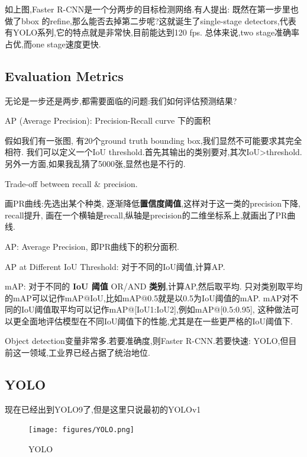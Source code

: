 如上图,Faster R-CNN是一个分两步的目标检测网络.有人提出:
既然在第一步里也做了bbox 的refine,那么能否去掉第二步呢?这就诞生了single-stage 
detectors,代表有YOLO系列,它的特点就是非常快,目前能达到120 fps.
总体来说,two stage准确率占优,而one stage速度更快.

\subsection{Evaluation Metrics}

无论是一步还是两步,都需要面临的问题:我们如何评估预测结果?


AP (Average Precision): Precision-Recall curve 下的面积

假如我们有一张图,
有20个ground truth bounding box,我们显然不可能要求其完全相符.
我们可以定义一个IoU threshold.首先其输出的类别要对,其次IoU>threshold.
另外一方面,如果我乱猜了5000张,显然也是不行的.

Trade-off between recall \& precision.

画PR曲线:先选出某个种类,
逐渐降低\textbf{置信度阈值},这样对于这一类的precision下降, recall提升, 
画在一个横轴是recall,纵轴是precision的二维坐标系上,就画出了PR曲线.

AP: Average Precision, 即PR曲线下的积分面积.

AP at Different IoU Threshold: 对于不同的IoU阈值,计算AP.

mAP: 对于不同的 \textbf{IoU 阈值} OR/AND \textbf{类别},计算AP,然后取平均.
只对类别取平均的mAP可以记作mAP@IoU,比如mAP@0.5就是以0.5为IoU阈值的mAP.
mAP对不同的IoU阈值取平均可以记作mAP@[IoU1:IoU2],例如mAP@[0.5:0.95],
这种做法可以更全面地评估模型在不同IoU阈值下的性能,尤其是在一些更严格的IoU阈值下.

Object detection变量非常多.若要准确度,则Faster R-CNN.若要快速:
YOLO,但目前这一领域,工业界已经占据了统治地位.

\subsection{YOLO}

现在已经出到YOLO9了,但是这里只说最初的YOLOv1

\begin{figure}[htbp]
    \centering
    \texttt{[image: figures/YOLO.png]}
    \caption{YOLO}
    \label{fig:YOLO}
\end{figure}

